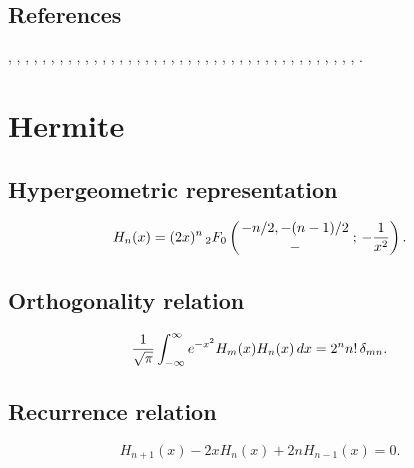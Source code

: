 \documentclass[envcountchap,graybox]{svmono}
\newcommand{\hyp}[5]{\mbox{}_{#1}{F}_{#2}
\left(\genfrac{}{}{0pt}{}{#3}{#4}\,;\,#5\right)}
\begin{document}
\subsection*{References}
\cite{Allaway76}, \cite{NAlSalam66}, \cite{AlSalam90}, \cite{AlSalamChihara76},
\cite{AlSalamIsmail76}, \cite{AndrewsAskey85}, \cite{Area+II}, \cite{Askey75},
\cite{AskeyGasper77}, \cite{AskeyWilson85}, \cite{AtakRahmanSuslov}, \cite{Bavinck98},
\cite{BavinckKoekoek}, \cite{Chihara78}, \cite{Chihara79}, \cite{Dunkl76}, \cite{Erdelyi+},
\cite{Gasper73I}, \cite{Gasper74}, \cite{Goh}, \cite{HoareRahman}, \cite{IsmailLetVal88},
\cite{Koekoek2000}, \cite{Koorn88}, \cite{Krasikov2002}, \cite{LabelleYehI},
\cite{LabelleYehII}, \cite{LabelleYehIII}, \cite{Lesky62}, \cite{Lesky89}, \cite{Lesky94I},
\cite{Lesky95II}, \cite{LewanowiczII}, \cite{LopezTemme2004}, \cite{Meixner}, \cite{Nikiforov+},
\cite{NikiforovUvarov}, \cite{Szafraniec}, \cite{Szego75}, \cite{Viennot}, \cite{Zarzo+},
\cite{Zeng90}.


\section{Hermite}

\par\setcounter{equation}{0}

\subsection*{Hypergeometric representation}
\begin{equation}
\label{DefHermite}
H_n(x)=(2x)^n\,\hyp{2}{0}{-n/2,-(n-1)/2}{-}{-\frac{1}{x^2}}.
\end{equation}

\subsection*{Orthogonality relation}
\begin{equation}
\label{OrtHermite}
\frac{1}{\sqrt{{\pi}}}\int_{-\infty}^{\infty}{e}^{-x^2}H_m(x)H_n(x)\,dx
=2^nn!\,\delta_{mn}.
\end{equation}

\subsection*{Recurrence relation}
\begin{equation}
\label{RecHermite}
H_{n+1}(x)-2xH_n(x)+2nH_{n-1}(x)=0.
\end{equation}
\end{document}
